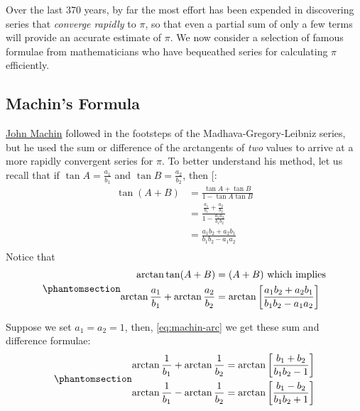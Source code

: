 \documentclass[
  a4paper,
]{article}
\begin{document}
Over the last 370 years, by far the most effort has been expended in
discovering series that \emph{converge rapidly} to \(\pi\), so that even
a partial sum of only a few terms will provide an accurate estimate of
\(\pi\). We now consider a selection of famous formulae from
mathematicians who have bequeathed series for calculating \(\pi\)
efficiently.

\subsection{Machin's Formula}\label{machins-formula}

\href{https://en.wikipedia.org/wiki/John_Machin}{John Machin} followed
in the footsteps of the Madhava-Gregory-Leibniz series, but he used the
sum or difference of the arctangents of \emph{two} values to arrive at a
more rapidly convergent series for \(\pi\). To better understand his
method, let us recall that if \(\tan A = \frac{a_1}{b_1}\) and
\(\tan B = \frac{a_2}{b_2}\), then
{[}\citeproc{ref-libre-inv-trig-deriv}{23}{]}: \[
\begin{aligned}
\tan(A + B) &= \frac{\tan A + \tan B}{1 - \tan A\tan B}\\
&= \frac{\frac{a_{1}}{b_{1}} + \frac{a_{2}}{b_{2}}}{1 - \frac{a_{1}a_{2}}{b_{1}b_{2}}}\\
&= \frac{a_{1}b_{2} + a_{2}b_{1}}{b_{1}b_{2} - a_{1}a_{2}}\\
\end{aligned}
\] Notice that \begin{equation}\phantomsection\label{eq:machin-arc}{
\begin{aligned}
\arctan\tan(A+B) &= (A + B) \mbox { which implies}\\
\arctan\frac{a_1}{b_1}  + \arctan\frac{a_2}{b_2} &= \arctan\left[\frac{a_{1}b_{2} + a_{2}b_{1}}{b_{1}b_{2} - a_{1}a_{2}}\right]\\
\end{aligned}
}\end{equation}

Suppose we set \(a_{1} = a_{2} = 1\), then, \cref{eq:machin-arc} we get
these sum and difference formulae:
\begin{equation}\phantomsection\label{eq:sum-diff-arct}{
\begin{aligned}
\arctan\frac{1}{b_1}  + \arctan\frac{1}{b_2} &= \arctan\left[\frac{b_{1} + b_{2}}
{b_{1}b_{2} - 1}\right]\\
\arctan\frac{1}{b_1}  - \arctan\frac{1}{b_2} &= \arctan\left[\frac{b_{1} - b_{2}}
{b_{1}b_{2} + 1}\right]
\end{aligned}
}\end{equation}
\end{document}
